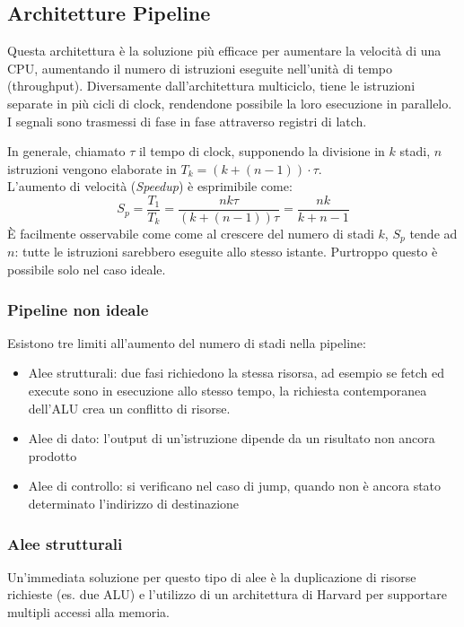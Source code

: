 \documentclass[../template]{subfiles}
\begin{document}
\subsection{Architetture Pipeline}
Questa architettura è la soluzione più efficace per aumentare la velocità di una CPU, aumentando il numero di istruzioni eseguite nell'unità di tempo (throughput).
Diversamente dall'architettura multiciclo, tiene le istruzioni separate in più cicli di clock, rendendone possibile la loro esecuzione in parallelo.
\\
I segnali sono trasmessi di fase in fase attraverso registri di latch.

In generale, chiamato $\tau$ il tempo di clock, supponendo la divisione in $k$ stadi, $n$ istruzioni vengono elaborate in $T_k = (k + (n-1)) \cdot \tau$.
\\
L'aumento di velocità (\textit{Speedup}) è esprimibile come:
\[
    S_p = \frac{T_1}{T_k}  = \frac{nk\tau}{(k + (n-1)) \tau} = \frac{nk}{k + n -1}
\]
È facilmente osservabile come come al crescere del numero di stadi $k$, $S_p$ tende ad $n$: tutte le istruzioni sarebbero eseguite allo stesso istante.  Purtroppo questo è possibile solo nel caso ideale.

\subsubsection{Pipeline non ideale}
Esistono tre limiti all'aumento del numero di stadi nella pipeline:
\begin{itemize}
    \item Alee strutturali: due fasi richiedono la stessa risorsa, ad esempio se fetch ed execute sono in esecuzione allo stesso tempo, la richiesta contemporanea dell'ALU crea un conflitto di risorse.
    \item Alee di dato: l'output di un'istruzione dipende da un risultato non ancora prodotto
    \item Alee di controllo: si verificano nel caso di jump, quando non è ancora stato determinato l'indirizzo
        di destinazione
\end{itemize}

\subsubsection{Alee strutturali}
Un'immediata soluzione per questo tipo di alee è la duplicazione di risorse richieste (es. due ALU) e l'utilizzo di un architettura di Harvard per supportare multipli accessi alla memoria.
\end{document}
